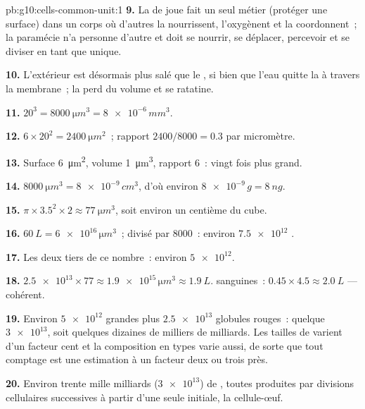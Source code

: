 \begin{solution}{pb:g10:cells-common-unit:1}
\textbf{9.} La  de joue fait un seul métier (protéger une
surface) dans un corps où d'autres  la nourrissent,
l'oxygènent et la coordonnent~; la paramécie n'a personne d'autre et
doit se nourrir, se déplacer, percevoir et se diviser en tant que
 unique.

\textbf{10.} L'extérieur est désormais plus salé que le ,
si bien que l'eau quitte la  à travers la membrane~; la 
perd du volume et se ratatine.

\textbf{11.} $20^3 = \qty{8000}{\micro m^3} = \num{8e-6}\,\unit{mm^3}$.

\textbf{12.} $6 \times 20^2 = \qty{2400}{\micro m^2}$~; rapport
$2400/8000 = 0.3$ par micromètre.

\textbf{13.} Surface \qty{6}{\micro m^2}, volume \qty{1}{\micro m^3},
rapport 6~: vingt fois plus grand.

\textbf{14.} $\qty{8000}{\micro m^3} = \num{8e-9}\,\unit{cm^3}$, d'où
environ $\num{8e-9}\,\unit{g} = \qty{8}{ng}$.

\textbf{15.} $\pi \times 3.5^2 \times 2 \approx \qty{77}{\micro m^3}$,
soit environ un centième du cube.

\textbf{16.} $\qty{60}{L} = \num{6e16}\,\unit{\micro m^3}$~; divisé par
8000~: environ $\num{7.5e12}$ .

\textbf{17.} Les deux tiers de ce nombre~: environ $\num{5e12}$.

\textbf{18.} $\num{2.5e13} \times 77 \approx \num{1.9e15}\,\unit{\micro
m^3} \approx \qty{1.9}{L}$.  sanguines~: $0.45 \times 4.5 \approx
\qty{2.0}{L}$ --- cohérent.

\textbf{19.} Environ $\num{5e12}$ grandes  plus
$\num{2.5e13}$ globules rouges~: quelque $\num{3e13}$, soit quelques
dizaines de milliers de milliards. Les tailles de  varient
d'un facteur cent et la composition en types varie aussi, de sorte que
tout comptage est une estimation à un facteur deux ou trois près.

\textbf{20.} Environ trente mille milliards ($\num{3e13}$) de
, toutes produites par divisions cellulaires successives à
partir d'une seule  initiale, la cellule-œuf.
\end{solution}

